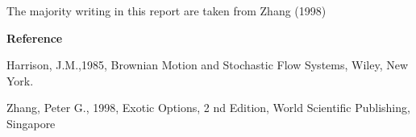 \documentclass[12pt]{article}
\renewcommand{\_}{\kern-1.5pt\textunderscore\kern-1.5pt}
\begin{document}
The majority writing in this report are taken from Zhang (1998)\par

\textbf{Reference}\par

Harrison, J.M.,1985, Brownian Motion and Stochastic Flow Systems, Wiley, New York. \par

Zhang, Peter G., 1998, Exotic Options, 2 nd Edition, World Scientific Publishing, Singapore\par


\vspace{\baselineskip}

\printbibliography
\end{document}
